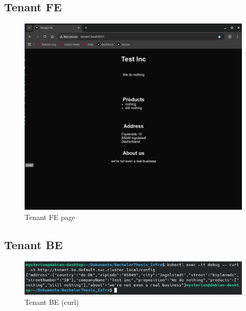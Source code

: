 \documentclass[11pt, a4paper, oneside, listof=totoc]{scrartcl}
\begin{document}
            \subsection{Tenant FE}\label{appsub:tenantfe}
                \begin{figure}[h!]
                    \centering
                    \includegraphics[width=\textwidth]{screenshots/eval/tenantfe/tenantfe.png}
                    \caption{Tenant FE page}\label{fig:tenantfe-page}
                \end{figure}

        \clearpage

            \FloatBarrier
            \subsection{Tenant BE}\label{appsub:tenantbe}
                \begin{figure}[h!]
                    \centering
                    \includegraphics[width=\textwidth]{screenshots/eval/tenantbe/curl.png}
                    \caption{Tenant BE (curl)}\label{fig:tenantbe-curl}
                \end{figure}
                
\end{document}
